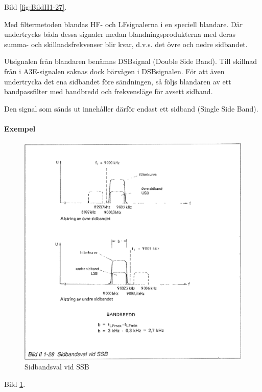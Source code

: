 Bild \ref{fig:BildII1-27}.

Med filtermetoden blandas HF- och LFsignalerna i en speciell blandare. Där
undertrycks båda dessa signaler medan blandningsprodukterna med deras summa-
och skillnadsfrekvenser blir kvar, d.v.s. det övre och nedre sidbandet.

Utsignalen från blandaren benämns DSBsignal (Double Side Band). Till skillnad
från i A3E-signalen saknas dock bärvågen i DSBsignalen. För att även
undertrycka det ena sidbandet före sändningen, så följs blandaren av ett
bandpassfilter med bandbredd och frekvensläge för avsett sidband.

Den signal som sänds ut innehåller därför endast ett sidband (Single Side Band).

\paragraph{Exempel}

\begin{figure}[ht]
\begin{center}
\includegraphics[width=14cm]{images/bild_2_1-28}
\caption{Sidbandsval vid SSB}
\label{fig:BildII1-28}
\end{center}
\end{figure}

Bild \ref{fig:BildII1-28}.

